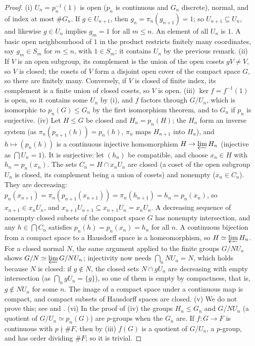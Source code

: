 \begin{proof}
(i) $U_n=p_n^{-1}(1)$ is open ($p_n$ is continuous and $G_n$ discrete), normal, and of index at most $\#G_n$. If $g\in U_{n+1}$, then $g_n=\pi_n(g_{n+1})=1$; so $U_{n+1}\subseteq U_n$, and
likewise $g\in U_n$ implies $g_m=1$ for all $m\le n$. An element of all $U_n$ is $1$. A basic open neighbourhood of $1$ in the product restricts finitely many coordinates,
say $g_m\in S_m$ for $m\le n$, with $1\in S_m$; it contains $U_n$ by the previous remark. (ii) If $V$ is an open subgroup, its complement is the union of the open cosets
$gV\ne V$, so $V$ is closed; the cosets of $V$ form a disjoint open cover of the compact space $G$, so there are finitely many. Conversely, if $V$ is closed of finite
index, its complement is a finite union of closed cosets, so $V$ is open. (iii) $\ker f=f^{-1}(1)$ is open, so it contains some $U_n$ by (i), and $f$ factors through
$G/U_n$, which is isomorphic to $p_n(G)\le G_n$ by the first isomorphism theorem, and to $G_n$ if $p_n$ is surjective. (iv) Let $H\le G$ be closed and $H_n=p_n(H)$; the
$H_n$ form an inverse system (as $\pi_n(p_{n+1}(h))=p_n(h)$, $\pi_n$ maps $H_{n+1}$ into $H_n$), and $h\mapsto(p_n(h))$ is a continuous injective homomorphism
$H\to\varprojlim H_n$ (injective as $\bigcap U_n=1$). It is surjective: let $(h_n)$ be compatible, and choose $x_n\in H$ with $h_n=p_n(x_n)$. The sets
$C_n=H\cap x_nU_n$ are closed (a coset of the open subgroup $U_n$ is closed, its complement being a union of cosets) and nonempty ($x_n\in C_n$). They are
decreasing: $p_n(x_{n+1})=\pi_n(p_{n+1}(x_{n+1}))=\pi_n(h_{n+1})=h_n=p_n(x_n)$, so $x_{n+1}\in x_nU_n$, and $x_{n+1}U_{n+1}\subseteq x_{n+1}U_n=x_nU_n$. A decreasing
sequence of nonempty closed subsets of the compact space $G$ has nonempty intersection, and any $h\in\bigcap C_n$ satisfies $p_n(h)=p_n(x_n)=h_n$ for all $n$. A continuous bijection from a compact space to a Hausdorff space is a homeomorphism, so
$H\simeq\varprojlim H_n$. For a closed normal $N$, the same argument applied to the finite groups $G/NU_n$ shows $G/N\simeq\varprojlim G/NU_n$; injectivity now needs $\bigcap_nNU_n=N$,
which holds because $N$ is closed: if $g\notin N$, the closed sets $N\cap gU_n$ are decreasing with empty intersection (as $\bigcap_ngU_n=\{g\}$), so one of them is empty
by compactness, that is, $g\notin NU_n$ for some $n$. The
image of a compact space under a continuous map is compact, and compact subsets of Hausdorff spaces are closed. (v) We do not prove this; see \cite[Chapter I,
Section 1]{NSW} and \cite[Chapter IV, Section 2]{Neukirch}. (vi) In the proof of (iv) the groups $H_n\le G_n$ and $G/NU_n$ (a quotient of $G/U_n\simeq p_n(G)$) are $p$-groups
when the $G_n$ are. If $f\colon G\to F$ is continuous with $p\nmid\#F$, then by (iii) $f(G)$ is a quotient of $G/U_n$, a $p$-group, and has order dividing $\#F$; so it is trivial.
\end{proof}

